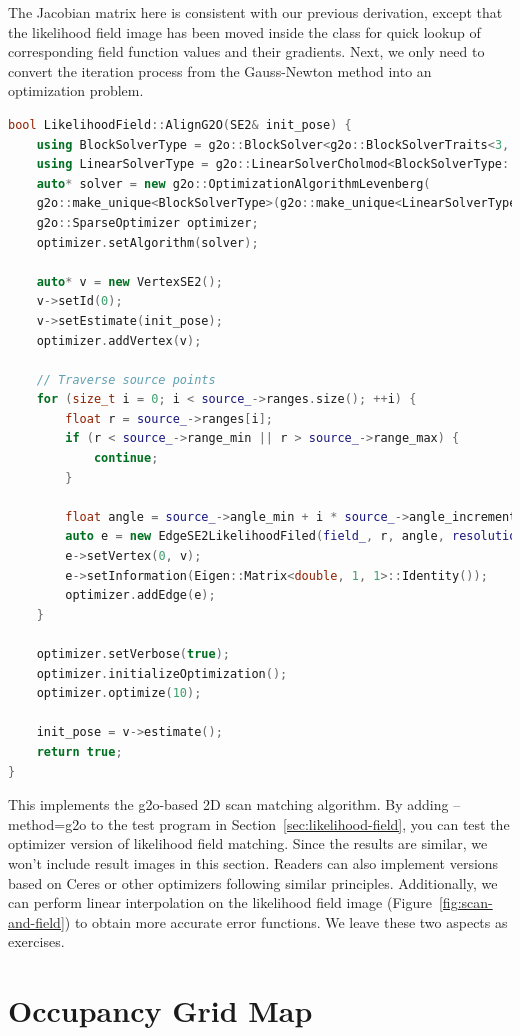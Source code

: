 The Jacobian matrix here is consistent with our previous derivation, except that the likelihood field image has been moved inside the class for quick lookup of corresponding field function values and their gradients. Next, we only need to convert the iteration process from the Gauss-Newton method into an optimization problem.

\begin{lstlisting}[language=c++,caption=src/ch6/likelihood\_field.cc]
bool LikelihoodField::AlignG2O(SE2& init_pose) {
	using BlockSolverType = g2o::BlockSolver<g2o::BlockSolverTraits<3, 1>>;
	using LinearSolverType = g2o::LinearSolverCholmod<BlockSolverType::PoseMatrixType>;
	auto* solver = new g2o::OptimizationAlgorithmLevenberg(
	g2o::make_unique<BlockSolverType>(g2o::make_unique<LinearSolverType>()));
	g2o::SparseOptimizer optimizer;
	optimizer.setAlgorithm(solver);
	
	auto* v = new VertexSE2();
	v->setId(0);
	v->setEstimate(init_pose);
	optimizer.addVertex(v);
	
	// Traverse source points
	for (size_t i = 0; i < source_->ranges.size(); ++i) {
		float r = source_->ranges[i];
		if (r < source_->range_min || r > source_->range_max) {
			continue;
		}
		
		float angle = source_->angle_min + i * source_->angle_increment;
		auto e = new EdgeSE2LikelihoodFiled(field_, r, angle, resolution_);
		e->setVertex(0, v);
		e->setInformation(Eigen::Matrix<double, 1, 1>::Identity());
		optimizer.addEdge(e);
	}
	
	optimizer.setVerbose(true);
	optimizer.initializeOptimization();
	optimizer.optimize(10);
	
	init_pose = v->estimate();
	return true;
}
\end{lstlisting}

This implements the g2o-based 2D scan matching algorithm. By adding --method=g2o to the test program in Section~\ref{sec:likelihood-field}, you can test the optimizer version of likelihood field matching. Since the results are similar, we won't include result images in this section. Readers can also implement versions based on Ceres or other optimizers following similar principles. Additionally, we can perform linear interpolation on the likelihood field image (Figure~\ref{fig:scan-and-field}) to obtain more accurate error functions. We leave these two aspects as exercises.

\section{Occupancy Grid Map}  
